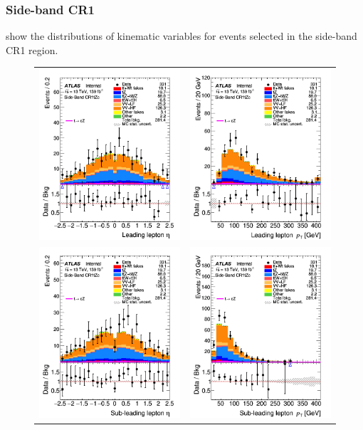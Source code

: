 \clearpage
\FloatBarrier
\subsubsection{Side-band CR1}
 show the distributions 
of kinematic variables for events selected in the side-band CR1 region. 

\begin{figure}[!htbp]
	\centering
	\begin{tabular}{cc}
		\includegraphics[width=.32\textwidth]{Chapters/CH6/figures/SBCR1/lep1_eta} &
		\includegraphics[width=.32\textwidth]{Chapters/CH6/figures/SBCR1/lep1_pt} \\
		\includegraphics[width=.32\textwidth]{Chapters/CH6/figures/SBCR1/lep2_eta} &
		\includegraphics[width=.32\textwidth]{Chapters/CH6/figures/SBCR1/lep2_pt} \\

\end{tabular}
\end{figure}
